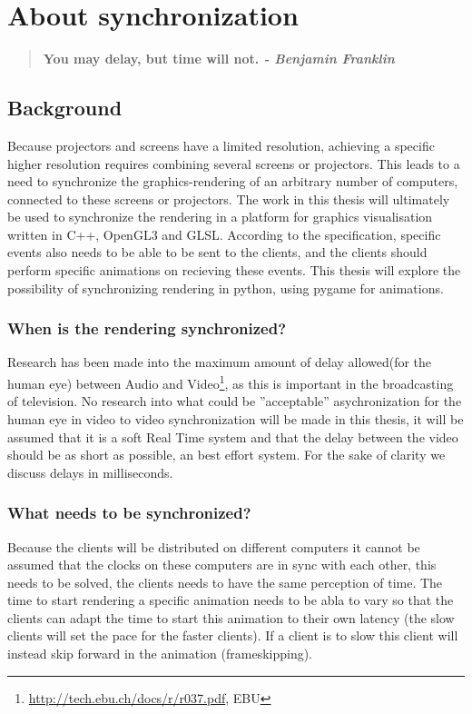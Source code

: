\chapter{About synchronization}

\begin{quotation}
\bf You may delay, but time will not.
\rm \center \em - Benjamin Franklin
\end{quotation}

\section{Background}

Because projectors and screens have a limited resolution, achieving a specific higher resolution requires combining several screens or projectors. This leads to a need to synchronize the graphics-rendering of an arbitrary number of computers, connected to these screens or projectors. The work in this thesis will ultimately be used to synchronize the rendering in a platform for graphics visualisation written in C++, OpenGL3 and GLSL. According to the specification, specific events also needs to be able to be sent to the clients, and the clients should perform specific animations on recieving these events. This thesis will explore the possibility of synchronizing rendering in python, using pygame for animations. 

\subsection{When is the rendering synchronized?}

Research has been made into the maximum amount of delay allowed(for the human eye) between Audio and Video\footnote{\url{http://tech.ebu.ch/docs/r/r037.pdf}, EBU}, as this is important in the broadcasting of television. No research into what could be ''acceptable'' asychronization for the human eye in video to video synchronization will be made in this thesis, it will be assumed that it is a soft Real Time system and that the delay between the video should be as short as possible, an best effort system. For the sake of clarity we discuss delays in milliseconds.

\subsection{What needs to be synchronized?}

Because the clients will be distributed on different computers it cannot be assumed that the clocks on these computers are in sync with each other, this needs to be solved, the clients needs to have the same perception of time. The time to start rendering a specific animation needs to be abla to vary so that the clients can adapt the time to start this animation to their own latency (the slow clients will set the pace for the faster clients). If a client is to slow this client will instead skip forward in the animation (frameskipping). 

